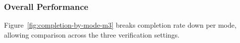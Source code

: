 \subsubsection*{Overall Performance}





Figure~\ref{fig:completion-by-mode-m3} breaks completion rate down per mode,
allowing comparison across the three verification settings.

